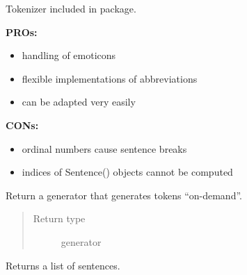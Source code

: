 \documentclass[letterpaper,10pt,english]{sphinxmanual}
\begin{document}
\begin{fulllineitems}
\label{api_reference:textblob_de.tokenizers.PatternTokenizer}
Tokenizer included in  package.

\textbf{PROs:}
\begin{itemize}
\item {} 
handling of emoticons

\item {} 
flexible implementations of abbreviations

\item {} 
can be adapted very easily

\end{itemize}

\textbf{CONs:}
\begin{itemize}
\item {} 
ordinal numbers cause sentence breaks

\item {} 
indices of Sentence() objects cannot be computed

\end{itemize}

\begin{fulllineitems}
\label{api_reference:textblob_de.tokenizers.PatternTokenizer.itokenize}
Return a generator that generates tokens ``on-demand''.

\begin{quote}\begin{description}
\item[{Return type}] \leavevmode
generator

\end{description}\end{quote}

\end{fulllineitems}


\begin{fulllineitems}
\label{api_reference:textblob_de.tokenizers.PatternTokenizer.sent_tokenize}
Returns a list of sentences.


\end{fulllineitems}
\end{fulllineitems}
\end{document}
